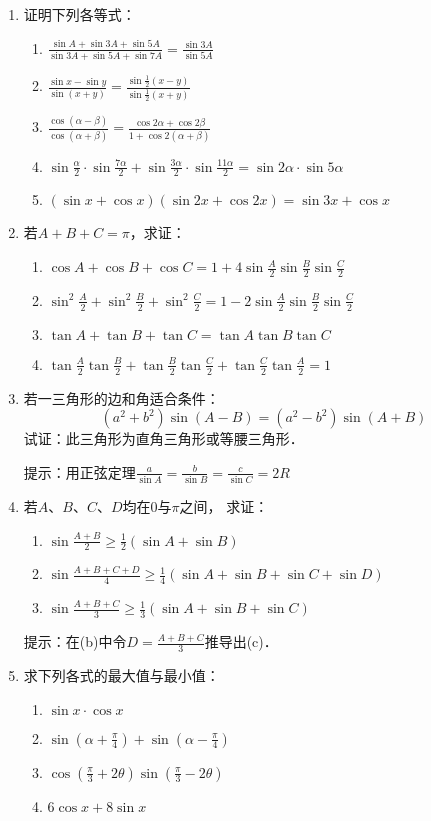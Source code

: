 \begin{enumerate}
\item 证明下列各等式：
\begin{enumerate}
\item $\frac{\sin A+\sin 3 A+\sin 5 A}{\sin 3 A+\sin 5 A+\sin 7 A}=\frac{\sin 3 A}{\sin 5 A}$
\item $\frac{\sin x-\sin y}{\sin (x+y)}=\frac{\sin \frac{1}{2}(x-y)}{\sin \frac{1}{2}(x+y)}$
\item $\frac{\cos(\alpha-\beta)}{\cos(\alpha+\beta)}=\frac{\cos2\alpha+\cos2\beta}{1+\cos 2(\alpha+\beta)}$
\item $\sin\frac{\alpha}{2}\cdot \sin\frac{7\alpha}{2}+\sin\frac{3\alpha}{2}\cdot\sin\frac{11\alpha}{2}=\sin2\alpha\cdot \sin 5\alpha$
\item $(\sin x+\cos x)(\sin 2x+\cos 2x)=\sin3x+\cos x$
\end{enumerate}

\item 若$A+B+C=\pi$，求证：
\begin{enumerate}
    \item $\cos A+\cos B+\cos C=1+4\sin\frac{A}{2}\sin\frac{B}{2}\sin\frac{C}{2}$
    \item $\sin^2\frac{A}{2}+\sin^2\frac{B}{2}+\sin^2\frac{C}{2}=1-2\sin\frac{A}{2}\sin\frac{B}{2}\sin\frac{C}{2}$
    \item $\tan A+\tan B+\tan C=\tan A\tan B\tan C$
    \item $\tan\frac{A}{2}\tan\frac{B}{2}+\tan\frac{B}{2}\tan\frac{C}{2}+\tan\frac{C}{2}\tan\frac{A}{2}=1$
\end{enumerate}

\item 若一三角形的边和角适合条件：
\[(a^2+b^2) \sin(A-B) =(a^2-b^2)\sin(A+B)\]
试证：此三角形为直角三角形或等腰三角形．

提示：用正弦定理$\frac{a}{\sin A}=\frac{b}{\sin B}=\frac{c}{\sin C}=2R$
\item 若$A$、$B$、$C$、$D$均在0与$\pi$之间，
求证：
\begin{enumerate}
    \item $\sin\frac{A+B}{2}\ge \frac{1}{2}(\sin A+\sin B)$
    \item $\sin\frac{A+B+C+D}{4}\ge \frac{1}{4}(\sin A+\sin B+\sin C+\sin D)$
    \item $\sin\frac{A+B+C}{3}\ge \frac{1}{3}(\sin A+\sin B+\sin C)$
\end{enumerate}
提示：在(b)中令$D=\frac{A+B+C}{3}$推导出(c)．

\item 求下列各式的最大值与最小值：
\begin{multicols}{2}
\begin{enumerate}
    \item $\sin x\cdot \cos x$
    \item $\sin\left(\alpha+\frac{\pi}{4}\right)+\sin\left(\alpha-\frac{\pi}{4}\right)$
    \item $\cos\left(\frac{\pi}{3}+2\theta\right)\sin\left(\frac{\pi}{3}-2\theta\right)$
    \item $6\cos x+8\sin x$
\end{enumerate}
\end{multicols}
\end{enumerate}

